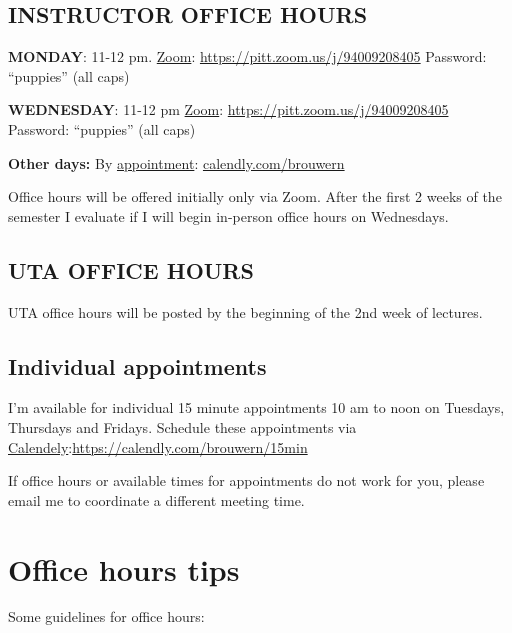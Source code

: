 \documentclass[
]{book}
\begin{document}
\hypertarget{instructor-office-hours}{%
\section{INSTRUCTOR OFFICE HOURS}\label{instructor-office-hours}}

\textbf{MONDAY}: 11-12 pm.
\href{https://pitt.zoom.us/j/94009208405}{Zoom}: \url{https://pitt.zoom.us/j/94009208405}
Password: ``puppies'' (all caps)

\textbf{WEDNESDAY}: 11-12 pm
\href{https://pitt.zoom.us/j/94009208405}{Zoom}: \url{https://pitt.zoom.us/j/94009208405}
Password: ``puppies'' (all caps)

\textbf{Other days:} By \href{calendly.com/brouwern}{appointment}: \url{calendly.com/brouwern}

Office hours will be offered initially only via Zoom. After the first 2 weeks of the semester I evaluate if I will begin in-person office hours on Wednesdays.

\hypertarget{uta-office-hours}{%
\section{UTA OFFICE HOURS}\label{uta-office-hours}}

UTA office hours will be posted by the beginning of the 2nd week of lectures.

\hypertarget{individual-appointments}{%
\section{Individual appointments}\label{individual-appointments}}

I'm available for individual 15 minute appointments 10 am to noon on Tuesdays, Thursdays and Fridays. Schedule these appointments via \href{https://calendly.com/brouwern/15min}{Calendely}:\url{https://calendly.com/brouwern/15min}

If office hours or available times for appointments do not work for you, please email me to coordinate a different meeting time.

\hypertarget{office-hours-tips}{%
\chapter{Office hours tips}\label{office-hours-tips}}

Some guidelines for office hours:
\end{document}
